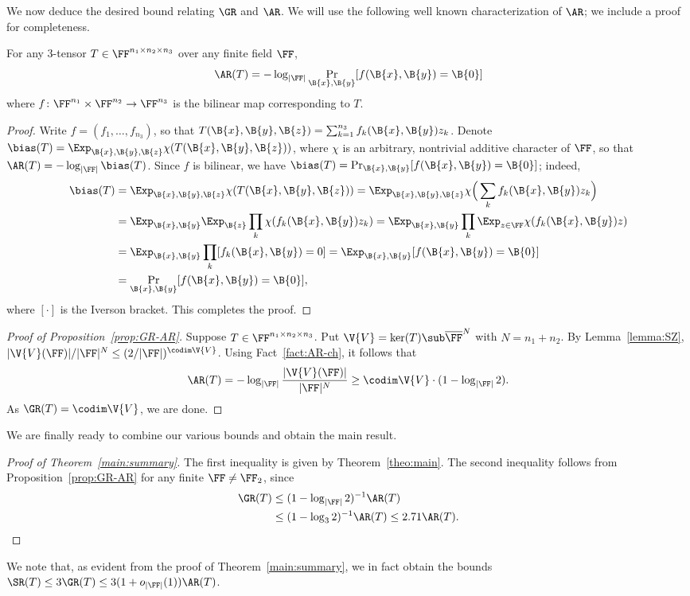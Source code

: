 We now deduce the desired bound relating $\GR$ and $\AR$.
We will use the following well known characterization of $\AR$; we include a proof for completeness.
\begin{fact}\label{fact:AR-ch}
For any $3$-tensor $T \in \FF^{n_1 \times n_2 \times n_3}$ over any finite field $\FF$,
$$\AR(T) = -\log_{|\FF|} \Pr_{\B{x},\B{y}}[f(\B{x},\B{y})=\B{0}]$$
where $f \colon \FF^{n_1} \times \FF^{n_2} \to \FF^{n_3}$ is the bilinear map corresponding to $T$.
\end{fact}
\begin{proof}
Write $f=(f_1,\ldots,f_{n_3})$, so that $T(\B{x},\B{y},\B{z})=\sum_{k=1}^{n_3} f_k(\B{x},\B{y})z_k$.
Denote $\bias(T) = \Exp_{\B{x},\B{y},\B{z}} \chi(T(\B{x},\B{y},\B{z}))$,
where $\chi$ is an arbitrary, nontrivial additive character of $\FF$,
so that $\AR(T) = -\log_{|\FF|}\bias(T)$.
Since $f$ is bilinear, we have $\bias(T) = 
\Pr_{\B{x},\B{y}} [f(\B{x},\B{y})=\B{0}]$; 
indeed, 
\begin{align*}
	\bias(T) &= \Exp_{\B{x},\B{y},\B{z}} \chi(T(\B{x},\B{y},\B{z}))
	= \Exp_{\B{x},\B{y},\B{z}} \chi\Big(\sum_k f_k(\B{x},\B{y})z_k \Big)\\
	&= \Exp_{\B{x},\B{y}} \Exp_{\B{z}}\prod_k\chi(f_k(\B{x},\B{y}) z_k)
	= \Exp_{\B{x},\B{y}} \prod_k \Exp_{z \in \FF}\chi(f_k(\B{x},\B{y}) z)\\
	&= \Exp_{\B{x},\B{y}} \prod_k [f_k(\B{x},\B{y})=0]
	= \Exp_{\B{x},\B{y}} [f(\B{x},\B{y})=\B{0}]\\
	&= \Pr_{\B{x},\B{y}} [f(\B{x},\B{y})=\B{0}] ,
\end{align*}
where $[\cdot]$ is the Iverson bracket. 
This completes the proof.
\end{proof}

\begin{proof}[Proof of Proposition~\ref{prop:GR-AR}]
Suppose $T \in \FF^{n_1 \times n_2 \times n_3}$. 
Put $\V{V} = \ker(T) \sub \overline{\FF}^{N}$ with $N=n_1+n_2$.
By Lemma~\ref{lemma:SZ},
$|\V{V}(\FF)|/|\FF|^{N} \le (2/|\FF|)^{\codim\V{V}}$.
Using Fact~\ref{fact:AR-ch}, it follows that
$$\AR(T) = -\log_{|\FF|} \frac{|\V{V}(\FF)|}{|\FF|^{N}}
\ge \codim\V{V} \cdot (1-\log_{|\FF|}2) .$$
As $\GR(T) = \codim\V{V}$, we are done.
\end{proof}



We are finally ready to combine our various bounds and obtain the main result.

\begin{proof}[Proof of Theorem~\ref{main:summary}]
The first inequality is given by Theorem~\ref{theo:main}.
The second inequality follows from Proposition~\ref{prop:GR-AR} for any finite $\FF \neq \FF_2$, since
\begin{align*}
	\GR(T) &\le (1-\log_{|\FF|}2)^{-1}\AR(T)\\ 
	&\le (1-\log_{3}2)^{-1}\AR(T) \le 2.71\AR(T).
\end{align*}
\end{proof}
We note that, as evident from the proof of Theorem~\ref{main:summary}, we in fact obtain the bounds $\SR(T) \le 3\GR(T) \le 3(1+o_{|\FF|}(1))\AR(T)$.
